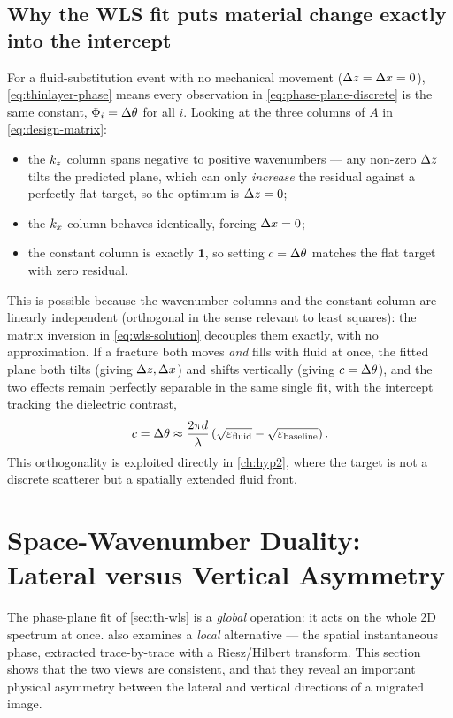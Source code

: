 \subsection{Why the WLS fit puts material change exactly into the intercept}

For a fluid-substitution event with no mechanical movement
($\Delta z=\Delta x=0$), \cref{eq:thinlayer-phase} means every observation in
\cref{eq:phase-plane-discrete} is the same constant, $\Phi_i = \Delta \theta$ for
all $i$. Looking at the three columns of $A$ in \cref{eq:design-matrix}:
\begin{itemize}
  \item the $k_z$ column spans negative to positive wavenumbers --- any
    non-zero $\Delta z$ tilts the predicted plane, which can only \emph{increase}
    the residual against a perfectly flat target, so the optimum is $\Delta z=0$;
  \item the $k_x$ column behaves identically, forcing $\Delta x=0$;
  \item the constant column is exactly $\mathbf 1$, so setting $c=\Delta \theta$
    matches the flat target with zero residual.
\end{itemize}
This is possible because the wavenumber columns and the constant column are
linearly independent (orthogonal in the sense relevant to least squares): the
matrix inversion in \cref{eq:wls-solution} decouples them exactly, with no
approximation. If a fracture both moves \emph{and} fills with fluid at once,
the fitted plane both tilts (giving $\Delta z,\Delta x$) and shifts vertically (giving
$c=\Delta \theta$), and the two effects remain perfectly separable in the same
single fit, with the intercept tracking the dielectric contrast,
\begin{equation}
  c = \Delta \theta \approx \frac{2\pi d}{\lambda}
    \left(\sqrt{\varepsilon_{\mathrm{fluid}}} - \sqrt{\varepsilon_{\mathrm{baseline}}}\right).
  \label{eq:intercept-material}
\end{equation}
This orthogonality is exploited directly in \cref{ch:hyp2}, where the
target is not a discrete scatterer but a spatially extended fluid front.

\section{Space-Wavenumber Duality: Lateral versus Vertical Asymmetry}
\label{sec:th-duality}

The phase-plane fit of \cref{sec:th-wls} is a \emph{global} operation: it
acts on the whole 2D spectrum at once.  also examines a
\emph{local} alternative --- the spatial instantaneous phase, extracted
trace-by-trace with a Riesz/Hilbert transform. This section shows that the
two views are consistent, and that they reveal an important physical
asymmetry between the lateral and vertical directions of a migrated image.

